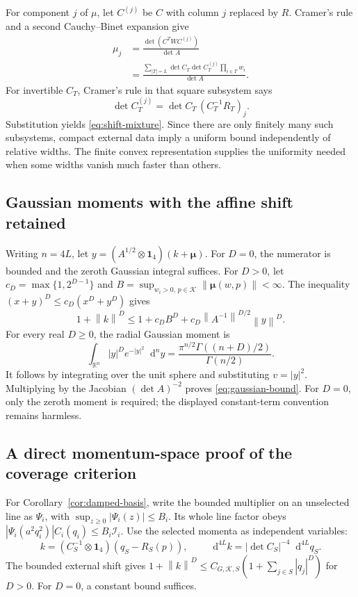 \documentclass[final,5p,times,twocolumn,numbers,nopreprintline]{elsarticle}
\numberwithin{equation}{section}
\theoremstyle{definition}
\theoremstyle{remark}
\newcommand{\dd}{\mathop{}\!\mathrm d}
\newcommand{\RR}{\mathbb R}
\newcommand{\one}{\mathbf 1}
\newcommand{\norm}[1]{\left\lVert #1\right\rVert}
\newcommand{\abs}[1]{\left\lvert #1\right\rvert}
\newcommand{\bmu}{\boldsymbol{\mu}}
\begin{document}
For component \(j\) of \(\mu\), let \(C^{(j)}\) be \(C\)
with column \(j\) replaced by \(R\).
Cramer's rule and a second Cauchy--Binet expansion give
\begin{align}
 \mu_j
 &=\frac{\det(C^TWC^{(j)})}{\det A}\nonumber\\
 &=\frac{
 \sum_{|T|=L}\det C_T\det C_T^{(j)}
                          \prod_{i\in T}w_i}
 {\det A}.
 \label{eq:Cramer-shift}
\end{align}
For invertible \(C_T\), Cramer's rule in that square subsystem
says
\[
 \det C_T^{(j)}
     =\det C_T\,(C_T^{-1}R_T)_j.
\]
Substitution yields \eqref{eq:shift-mixture}. Since there are
only finitely many such subsystems, compact external data imply
a uniform bound independently of relative widths. The finite convex
representation supplies the uniformity needed when some widths
vanish much faster than others.

\subsection{Gaussian moments with the affine shift retained}

Writing \(n=4L\), let
\(y=(A^{1/2}\otimes\one_4)(k+\bmu)\).
For \(D=0\), the numerator is bounded and the zeroth Gaussian
integral suffices. For \(D>0\), let
\(c_D=\max\{1,2^{D-1}\}\) and
\(B=\sup_{w_i>0,\,p\in\mathcal K}\norm{\bmu(w,p)}<\infty\).
The inequality \((x+y)^D\leq c_D(x^D+y^D)\) gives
\[
 1+\norm{k}^D\leq
 1+c_DB^D+c_D\norm{A^{-1}}^{D/2}\norm{y}^D.
\]
For every real \(D\geq0\), the radial Gaussian moment is
\begin{equation}
 \int_{\RR^n}|y|^D e^{-|y|^2}\dd^ny
   =\frac{\pi^{n/2}\Gamma((n+D)/2)}{\Gamma(n/2)}.
 \label{eq:Gaussian-moment-exact}
\end{equation}
It follows by integrating over the unit sphere and substituting
\(v=|y|^2\). Multiplying by the Jacobian
\((\det A)^{-2}\) proves \eqref{eq:gaussian-bound}.
For \(D=0\), only the zeroth moment is required; the displayed
constant-term convention remains harmless.

\subsection{A direct momentum-space proof of the coverage criterion}
\label{sec:direct-loop-proof}

For Corollary~\ref{cor:damped-basis}, write the bounded multiplier
on an unselected line as \(\Psi_i\), with
\(\sup_{z\geq0}|\Psi_i(z)|\leq B_i\). Its whole line factor obeys
\(\abs{\Psi_i(a^2q_i^2)}C_i(q_i)\leq B_i\mathcal I_i\).
Use the selected momenta as independent variables:
\[
 k=(C_S^{-1}\otimes\one_4)(q_S-R_S(p)),\qquad
 \dd^{4L}k=|\det C_S|^{-4}\dd^{4L}q_S.
\]
The bounded external shift gives
\(1+\norm{k}^D\leq C_{G,\mathcal K,S}
(1+\sum_{j\in S}|q_j|^D)\) for \(D>0\).
For \(D=0\), a constant bound suffices.
\end{document}
